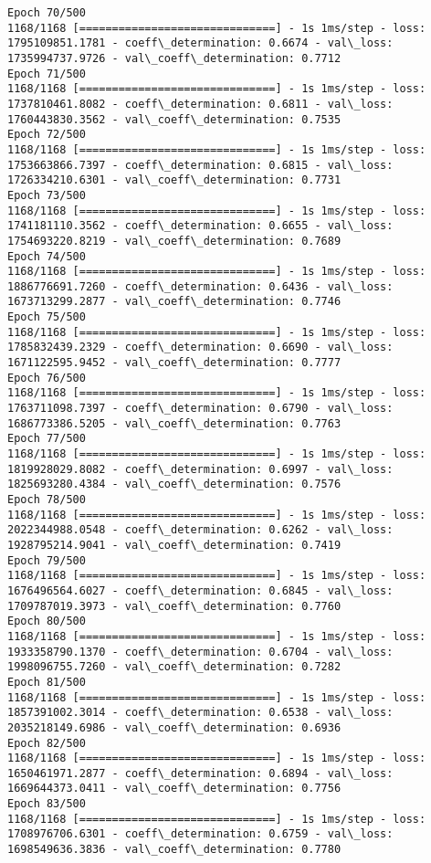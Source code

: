 \documentclass[11pt]{article}
\begin{document}
\begin{Verbatim}[commandchars=\\\{\}]
Epoch 70/500
1168/1168 [==============================] - 1s 1ms/step - loss: 1795109851.1781 - coeff\_determination: 0.6674 - val\_loss: 1735994737.9726 - val\_coeff\_determination: 0.7712
Epoch 71/500
1168/1168 [==============================] - 1s 1ms/step - loss: 1737810461.8082 - coeff\_determination: 0.6811 - val\_loss: 1760443830.3562 - val\_coeff\_determination: 0.7535
Epoch 72/500
1168/1168 [==============================] - 1s 1ms/step - loss: 1753663866.7397 - coeff\_determination: 0.6815 - val\_loss: 1726334210.6301 - val\_coeff\_determination: 0.7731
Epoch 73/500
1168/1168 [==============================] - 1s 1ms/step - loss: 1741181110.3562 - coeff\_determination: 0.6655 - val\_loss: 1754693220.8219 - val\_coeff\_determination: 0.7689
Epoch 74/500
1168/1168 [==============================] - 1s 1ms/step - loss: 1886776691.7260 - coeff\_determination: 0.6436 - val\_loss: 1673713299.2877 - val\_coeff\_determination: 0.7746
Epoch 75/500
1168/1168 [==============================] - 1s 1ms/step - loss: 1785832439.2329 - coeff\_determination: 0.6690 - val\_loss: 1671122595.9452 - val\_coeff\_determination: 0.7777
Epoch 76/500
1168/1168 [==============================] - 1s 1ms/step - loss: 1763711098.7397 - coeff\_determination: 0.6790 - val\_loss: 1686773386.5205 - val\_coeff\_determination: 0.7763
Epoch 77/500
1168/1168 [==============================] - 1s 1ms/step - loss: 1819928029.8082 - coeff\_determination: 0.6997 - val\_loss: 1825693280.4384 - val\_coeff\_determination: 0.7576
Epoch 78/500
1168/1168 [==============================] - 1s 1ms/step - loss: 2022344988.0548 - coeff\_determination: 0.6262 - val\_loss: 1928795214.9041 - val\_coeff\_determination: 0.7419
Epoch 79/500
1168/1168 [==============================] - 1s 1ms/step - loss: 1676496564.6027 - coeff\_determination: 0.6845 - val\_loss: 1709787019.3973 - val\_coeff\_determination: 0.7760
Epoch 80/500
1168/1168 [==============================] - 1s 1ms/step - loss: 1933358790.1370 - coeff\_determination: 0.6704 - val\_loss: 1998096755.7260 - val\_coeff\_determination: 0.7282
Epoch 81/500
1168/1168 [==============================] - 1s 1ms/step - loss: 1857391002.3014 - coeff\_determination: 0.6538 - val\_loss: 2035218149.6986 - val\_coeff\_determination: 0.6936
Epoch 82/500
1168/1168 [==============================] - 1s 1ms/step - loss: 1650461971.2877 - coeff\_determination: 0.6894 - val\_loss: 1669644373.0411 - val\_coeff\_determination: 0.7756
Epoch 83/500
1168/1168 [==============================] - 1s 1ms/step - loss: 1708976706.6301 - coeff\_determination: 0.6759 - val\_loss: 1698549636.3836 - val\_coeff\_determination: 0.7780

\end{Verbatim}
\end{document}
